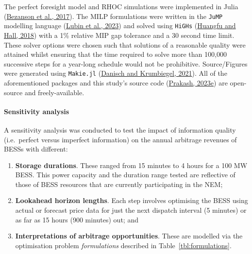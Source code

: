 \documentclass[12pt,a4paper,]{report}
\providecommand{\tightlist}{%
  \setlength{\itemsep}{0pt}\setlength{\parskip}{0pt}}
\begin{document}
The perfect foresight model and RHOC simulations were implemented in
Julia (\protect\hyperlink{ref-bezansonJuliaFreshApproach2017}{Bezanson
et al., 2017}). The MILP formulations were written in the \texttt{JuMP}
modelling language
(\protect\hyperlink{ref-lubinJuMPRecentImprovements2023}{Lubin et al.,
2023}) and solved using \texttt{HiGHs}
(\protect\hyperlink{ref-huangfuParallelizingDualRevised2018}{Huangfu and
Hall, 2018}) with a 1\% relative MIP gap tolerance and a 30 second time
limit. These solver options were chosen such that solutions of a
reasonable quality were attained whilst ensuring that the time required
to solve more than 100,000 successive steps for a year-long schedule
would not be prohibitive. Source/Figures were generated using
\texttt{Makie.jl}
(\protect\hyperlink{ref-danischMakieJlFlexible2021}{Danisch and
Krumbiegel, 2021}). All of the aforementioned packages and this study's
source code
(\protect\hyperlink{ref-prakashNEMStorageUnderUncertainty2023}{Prakash,
2023e}) are open-source and freely-available.

\hypertarget{sec:info-case_study-bess_simulations-method-sensitivity_analysis}{%
\paragraph{Sensitivity
analysis}\label{sec:info-case_study-bess_simulations-method-sensitivity_analysis}}

A sensitivity analysis was conducted to test the impact of information
quality (i.e.~perfect versus imperfect information) on the annual
arbitrage revenues of BESSs with different:

\begin{enumerate}
\def\labelenumi{\arabic{enumi}.}
\tightlist
\item
  \textbf{Storage durations}. These ranged from 15 minutes to 4 hours
  for a 100 MW BESS. This power capacity and the duration range tested
  are reflective of those of BESS resources that are currently
  participating in the NEM;
\item
  \textbf{Lookahead horizon lengths}. Each step involves optimising the
  BESS using actual or forecast price data for just the next dispatch
  interval (5 minutes) or as far as 15 hours (900 minutes) out; and
\item
  \textbf{Interpretations of arbitrage opportunities}. These are
  modelled via the optimisation problem \emph{formulations} described in
  Table~\ref{tbl:formulations}.
\end{enumerate}
\end{document}
